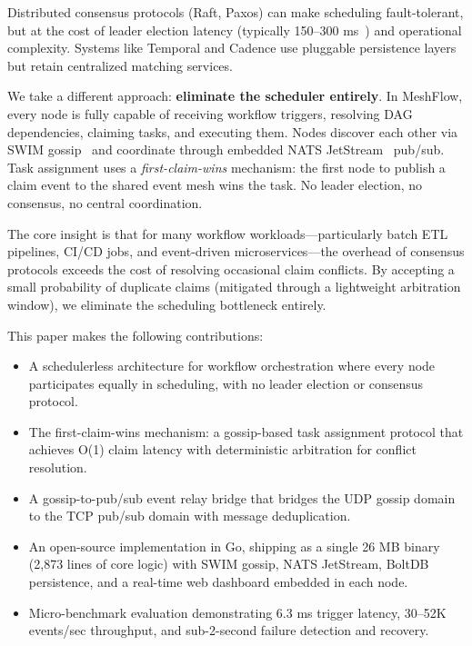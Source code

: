 \documentclass[sigconf]{acmart}
\begin{document}
Distributed consensus protocols (Raft, Paxos) can make scheduling fault-tolerant, but at the cost of leader election latency (typically 150--300 ms~\cite{raft}) and operational complexity. Systems like Temporal and Cadence use pluggable persistence layers but retain centralized matching services.

We take a different approach: \textbf{eliminate the scheduler entirely}. In MeshFlow, every node is fully capable of receiving workflow triggers, resolving DAG dependencies, claiming tasks, and executing them. Nodes discover each other via SWIM gossip~\cite{swim} and coordinate through embedded NATS JetStream~\cite{nats} pub/sub. Task assignment uses a \textit{first-claim-wins} mechanism: the first node to publish a claim event to the shared event mesh wins the task. No leader election, no consensus, no central coordination.

The core insight is that for many workflow workloads---particularly batch ETL pipelines, CI/CD jobs, and event-driven microservices---the overhead of consensus protocols exceeds the cost of resolving occasional claim conflicts. By accepting a small probability of duplicate claims (mitigated through a lightweight arbitration window), we eliminate the scheduling bottleneck entirely.

This paper makes the following contributions:

\begin{itemize}
\item A schedulerless architecture for workflow orchestration where every node participates equally in scheduling, with no leader election or consensus protocol.
\item The first-claim-wins mechanism: a gossip-based task assignment protocol that achieves O(1) claim latency with deterministic arbitration for conflict resolution.
\item A gossip-to-pub/sub event relay bridge that bridges the UDP gossip domain to the TCP pub/sub domain with message deduplication.
\item An open-source implementation in Go, shipping as a single 26 MB binary (2,873 lines of core logic) with SWIM gossip, NATS JetStream, BoltDB persistence, and a real-time web dashboard embedded in each node.
\item Micro-benchmark evaluation demonstrating 6.3 ms trigger latency, 30--52K events/sec throughput, and sub-2-second failure detection and recovery.
\end{itemize}
\end{document}
